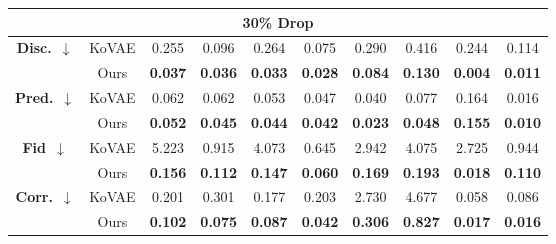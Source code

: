 \documentclass{article}
\theoremstyle{plain}
\theoremstyle{definition}
\theoremstyle{remark}
\begin{document}
{\begin{table*}[!t]
{\begin{tabular}{cc|cccccccc}
    \multicolumn{10}{c}{\textbf{30\% Drop}} \\
    \midrule
    \multirow{2}{*}{\textbf{Disc.}~$\downarrow$}
      & KoVAE  & 0.255 & 0.096 & 0.264 & 0.075 & 0.290 & 0.416 & 0.244 & 0.114 \\
      & Ours   & \cellcolor{blue!10}\textbf{0.037} 
               & \cellcolor{blue!10}\textbf{0.036} 
               & \cellcolor{blue!10}\textbf{0.033} 
               & \cellcolor{blue!10}\textbf{0.028} 
               & \cellcolor{blue!10}\textbf{0.084} 
               & \cellcolor{blue!10}\textbf{0.130} 
               & \cellcolor{blue!10}\textbf{0.004} 
               & \cellcolor{blue!10}\textbf{0.011} \\
    \midrule
    \multirow{2}{*}{\textbf{Pred.}~$\downarrow$} 
      & KoVAE  & 0.062 & 0.062 & 0.053 & 0.047 & 0.040 & 0.077 & 0.164 & 0.016 \\
      & Ours   & \cellcolor{blue!10}\textbf{0.052}
               & \cellcolor{blue!10}\textbf{0.045}
               & \cellcolor{blue!10}\textbf{0.044}
               & \cellcolor{blue!10}\textbf{0.042}
               & \cellcolor{blue!10}\textbf{0.023}
               & \cellcolor{blue!10}\textbf{0.048}
               & \cellcolor{blue!10}\textbf{0.155}
               & \cellcolor{blue!10}\textbf{0.010} \\
    \midrule
    \multirow{2}{*}{\textbf{Fid}~$\downarrow$}     
      & KoVAE  & 5.223 & 0.915 & 4.073 & 0.645 & 2.942 & 4.075 & 2.725 & 0.944 \\
      & Ours   & \cellcolor{blue!10}\textbf{0.156}
               & \cellcolor{blue!10}\textbf{0.112}
               & \cellcolor{blue!10}\textbf{0.147}
               & \cellcolor{blue!10}\textbf{0.060}
               & \cellcolor{blue!10}\textbf{0.169}
               & \cellcolor{blue!10}\textbf{0.193}
               & \cellcolor{blue!10}\textbf{0.018}
               & \cellcolor{blue!10}\textbf{0.110} \\
    \midrule
    \multirow{2}{*}{\textbf{Corr.}~$\downarrow$}     
      & KoVAE  & 0.201 & 0.301 & 0.177 & 0.203 & 2.730 & 4.677 & 0.058 & 0.086 \\
      & Ours   & \cellcolor{blue!10}\textbf{0.102}
               & \cellcolor{blue!10}\textbf{0.075}
               & \cellcolor{blue!10}\textbf{0.087}
               & \cellcolor{blue!10}\textbf{0.042}
               & \cellcolor{blue!10}\textbf{0.306}
               & \cellcolor{blue!10}\textbf{0.827}
               & \cellcolor{blue!10}\textbf{0.017}
               & \cellcolor{blue!10}\textbf{0.016} \\
    \midrule


\end{tabular}}
\end{table*}}
\end{document}
